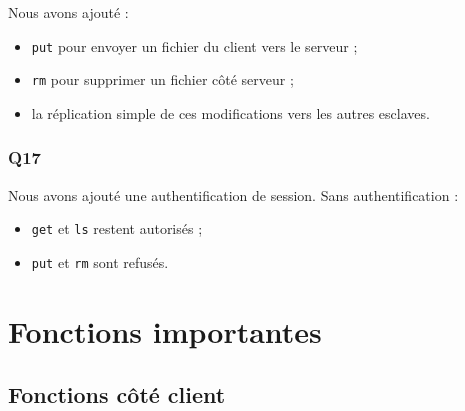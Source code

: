\documentclass[a4paper,11pt]{article}
\begin{document}
Nous avons ajouté :

\begin{itemize}[leftmargin=*]
    \item \texttt{put} pour envoyer un fichier du client vers le serveur ;
    \item \texttt{rm} pour supprimer un fichier côté serveur ;
    \item la réplication simple de ces modifications vers les autres esclaves.
\end{itemize}

\subsubsection{Q17}

Nous avons ajouté une authentification de session. Sans authentification :

\begin{itemize}[leftmargin=*]
    \item \texttt{get} et \texttt{ls} restent autorisés ;
    \item \texttt{put} et \texttt{rm} sont refusés.
\end{itemize}
\newpage
\section{Fonctions importantes}

\subsection{Fonctions côté client}
\end{document}
